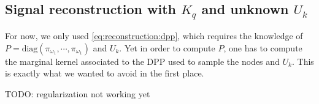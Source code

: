 \documentclass{article}
\begin{document}
\subsection[Signal reconstruction with Kq and unknown Uk]{Signal reconstruction with $K_q$ and unknown $U_k$}


For now, we only used \eqref{eq:reconstruction:dpp}, which requires the knowledge of $P = \mathrm{diag} (\pi_{\omega_1}, \cdots, \pi_{\omega_1})$ and $U_k$. Yet in order to compute $P$, one has to compute the marginal kernel associated to the DPP used to sample the nodes and $U_k$. This is exactly what we wanted to avoid in the first place.


TODO: regularization not working yet

	
\newpage
 

\end{document}
